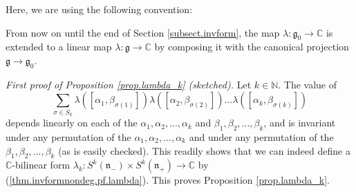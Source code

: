 \documentclass[etingof-lie.tex]{subfiles}
\begin{document}
Here, we are using the following convention:

\begin{Convention}
From now on until the end of Section \ref{subsect.invform}, the map
$\lambda:\mathfrak{g}_{0}\rightarrow\mathbb{C}$ is extended to a linear map
$\lambda:\mathfrak{g}\rightarrow\mathbb{C}$ by composing it with the canonical
projection $\mathfrak{g}\rightarrow\mathfrak{g}_{0}$.
\end{Convention}

\textit{First proof of Proposition \ref{prop.lambda_k} (sketched).} Let
$k\in\mathbb{N}$. The value of
\[
\sum\limits_{\sigma\in S_{k}}\lambda\left(  \left[  \alpha_{1},\beta
_{\sigma\left(  1\right)  }\right]  \right)  \lambda\left(  \left[  \alpha
_{2},\beta_{\sigma\left(  2\right)  }\right]  \right)  ...\lambda\left(
\left[  \alpha_{k},\beta_{\sigma\left(  k\right)  }\right]  \right)
\]
depends linearly on each of the $\alpha_{1},\alpha_{2},...,\alpha_{k}$ and
$\beta_{1},\beta_{2},...,\beta_{k}$, and is invariant under any permutation of
the $\alpha_{1},\alpha_{2},...,\alpha_{k}$ and under any permutation of the
$\beta_{1},\beta_{2},...,\beta_{k}$ (as is easily checked). This readily shows
that we can indeed define a $\mathbb{C}$-bilinear form $\lambda_{k}%
:S^{k}\left(  \mathfrak{n}_{-}\right)  \times S^{k}\left(  \mathfrak{n}%
_{+}\right)  \rightarrow\mathbb{C}$ by (\ref{thm.invformnondeg.pf.lambda}).
This proves Proposition \ref{prop.lambda_k}.
\end{document}
